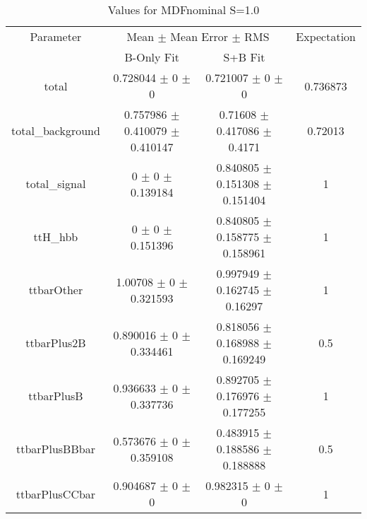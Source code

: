 \begin{table}
\centering
\caption{Values for MDFnominal S=1.0}
\begin{tabular}{cccc}
\toprule
Parameter & \multicolumn{2}{c}{Mean $\pm$ Mean Error $\pm$ RMS} & Expectation\\
 & B-Only Fit & S+B Fit & \\
\midrule
total & \num{0.728044} $\pm$ \num{0} $\pm$ \num{0} & \num{0.721007} $\pm$ \num{0} $\pm$ \num{0} & \num{0.736873}\\
total\_background & \num{0.757986} $\pm$ \num{0.410079} $\pm$ \num{0.410147} & \num{0.71608} $\pm$ \num{0.417086} $\pm$ \num{0.4171} & \num{0.72013}\\
total\_signal & \num{0} $\pm$ \num{0} $\pm$ \num{0.139184} & \num{0.840805} $\pm$ \num{0.151308} $\pm$ \num{0.151404} & \num{1}\\
ttH\_hbb & \num{0} $\pm$ \num{0} $\pm$ \num{0.151396} & \num{0.840805} $\pm$ \num{0.158775} $\pm$ \num{0.158961} & \num{1}\\
ttbarOther & \num{1.00708} $\pm$ \num{0} $\pm$ \num{0.321593} & \num{0.997949} $\pm$ \num{0.162745} $\pm$ \num{0.16297} & \num{1}\\
ttbarPlus2B & \num{0.890016} $\pm$ \num{0} $\pm$ \num{0.334461} & \num{0.818056} $\pm$ \num{0.168988} $\pm$ \num{0.169249} & \num{0.5}\\
ttbarPlusB & \num{0.936633} $\pm$ \num{0} $\pm$ \num{0.337736} & \num{0.892705} $\pm$ \num{0.176976} $\pm$ \num{0.177255} & \num{1}\\
ttbarPlusBBbar & \num{0.573676} $\pm$ \num{0} $\pm$ \num{0.359108} & \num{0.483915} $\pm$ \num{0.188586} $\pm$ \num{0.188888} & \num{0.5}\\
ttbarPlusCCbar & \num{0.904687} $\pm$ \num{0} $\pm$ \num{0} & \num{0.982315} $\pm$ \num{0} $\pm$ \num{0} & \num{1}\\
\bottomrule
\end{tabular}
\end{table}